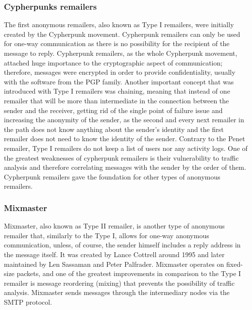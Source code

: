 \subsubsection{Cypherpunks remailers}
The first anonymous remailers, also known as Type I remailers, were initially created by the Cypherpunk movement. Cypherpunk remailers can only be used for one-way communication as there is no possibility for the recipient of the message to reply. 
Cypherpunk remailers, as the whole Cypherpunk movement, attached huge importance to the cryptographic aspect of communication; therefore, messages were encrypted in order to provide confidentiality, usually with the software from the PGP family.
Another important concept that was introduced with Type I remailers was chaining, meaning that instead of one remailer that will be more than intermediate in the connection between the sender and the receiver, getting rid of the single point of failure issue and increasing the anonymity of the sender, as the second and every next remailer in the path does not know anything about the sender’s identity and the first remailer does not need to know the identity of the sender.
Contrary to the Penet remailer, Type I remailers do not keep a list of users nor any activity logs.
One of the greatest weaknesses of cypherpunk remailers is their vulnerability to traffic analysis and therefore correlating messages with the sender by the order of them.
Cypherpunk remailers gave the foundation for other types of anonymous remailers.

\subsubsection{Mixmaster}
Mixmaster, also known as Type II remailer, is another type of anonymous remailer that, similarly to the Type I, allows for one-way anonymous communication, unless, of course, the sender himself includes a reply address in the message itself. It was created by Lance Cottrell around 1995 and later maintained by Len Sassaman and Peter Palfrader. Mixmaster operates on fixed-size packets, and one of the greatest improvements in comparison to the Type I remailer is message reordering (mixing) that prevents the possibility of traffic analysis. Mixmaster sends messages through the intermediary nodes via the SMTP protocol.

